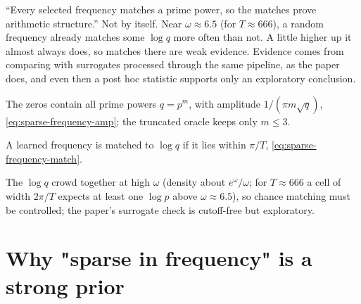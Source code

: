\begin{pitfall}
``Every selected frequency matches a prime power, so the matches prove arithmetic structure.'' Not by itself. Near $\omega\approx6.5$ (for $T\approx666$), a random frequency already matches some $\log q$ more often than not. A little higher up it almost always does, so matches there are weak evidence. Evidence comes from comparing with surrogates processed through the same pipeline, as the paper does, and even then a post hoc statistic supports only an exploratory conclusion.
\end{pitfall}

\begin{keyideas}
\item The zeros contain all prime powers $q=p^m$, with amplitude $1/(\pi m\sqrt q)$, \eqref{eq:sparse-frequency-amp}; the truncated oracle keeps only $m\le3$.
\item A learned frequency is matched to $\log q$ if it lies within $\pi/T$, \eqref{eq:sparse-frequency-match}.
\item The $\log q$ crowd together at high $\omega$ (density about $e^\omega/\omega$; for $T\approx666$ a cell of width $2\pi/T$ expects at least one $\log p$ above $\omega\approx6.5$), so chance matching must be controlled; the paper's surrogate check is cutoff-free but exploratory.
\end{keyideas}

\section{Why "sparse in frequency" is a strong prior}\label{sec:sparse-frequency-prior}

